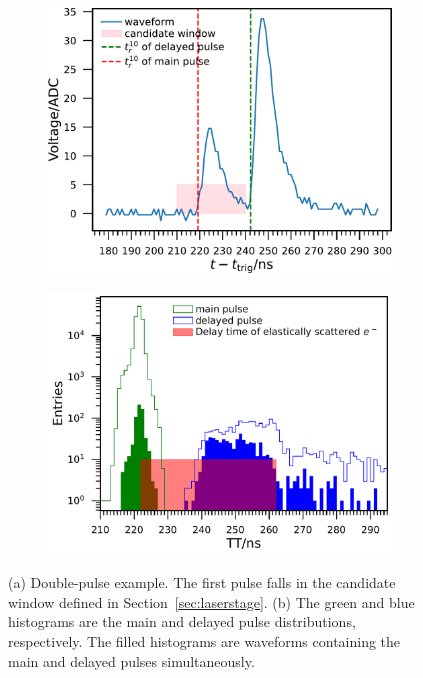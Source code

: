 \begin{figure}[!htbp]
    \centering
    \begin{subfigure}[t]{\SF\textwidth}
        \includegraphics[width=\textwidth]{figures/method/triggerDoublePulse.pdf}
        \caption{}%
        \label{fig:triggerTT2pulse}
    \end{subfigure}
    \begin{subfigure}[t]{\SF\textwidth}
        \includegraphics[width=\textwidth]{figures/method/triggerDelayedPulse.pdf}
        \caption{}%
        \label{fig:triggerTTlatepulse}
    \end{subfigure}
    \caption{(a) Double-pulse example. The first pulse falls in the candidate window defined in Section~\ref{sec:laserstage}. (b) The green and blue histograms are the main and delayed pulse distributions, respectively. The filled histograms are waveforms containing the main and delayed pulses simultaneously.}
\end{figure}

